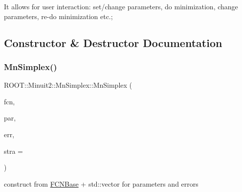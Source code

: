 It allows for user interaction\+: set/change parameters, do minimization, change parameters, re-\/do minimization etc.; 

\subsection{Constructor \& Destructor Documentation}
\mbox{\label{classROOT_1_1Minuit2_1_1MnSimplex_abc4ddf29140ab0ada1e90afbc33359cf}} 
\subsubsection{\texorpdfstring{MnSimplex()}{MnSimplex()}\hspace{0.1cm}{\footnotesize\ttfamily [1/21]}}
{\footnotesize\ttfamily R\+O\+O\+T\+::\+Minuit2\+::\+Mn\+Simplex\+::\+Mn\+Simplex (\begin{DoxyParamCaption}\item[{const \mbox{\hyperlink{classROOT_1_1Minuit2_1_1FCNBase}{F\+C\+N\+Base}} \&}]{fcn,  }\item[{const std\+::vector$<$ double $>$ \&}]{par,  }\item[{const std\+::vector$<$ double $>$ \&}]{err,  }\item[{unsigned int}]{stra = {} }\end{DoxyParamCaption})\hspace{0.3cm}{\ttfamily [inline]}}



construct from \mbox{\hyperlink{classROOT_1_1Minuit2_1_1FCNBase}{F\+C\+N\+Base}} + std\+::vector for parameters and errors 

\mbox{\label{classROOT_1_1Minuit2_1_1MnSimplex_a7c7c4c6af82a37f75f574e80db9b4d08}} 
